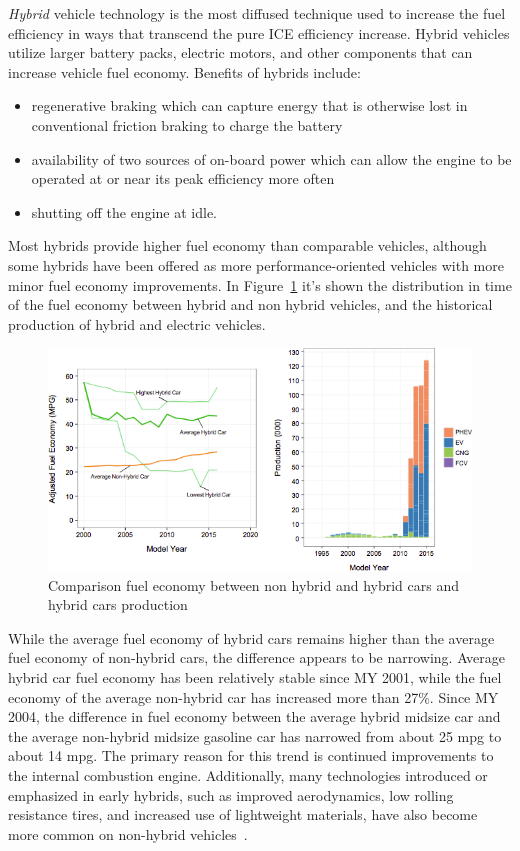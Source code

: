 \emph{Hybrid} vehicle technology is the most diffused technique used to increase the fuel efficiency in ways that transcend the pure ICE efficiency increase. Hybrid vehicles utilize larger battery packs, electric motors, and other components that can  increase vehicle fuel economy. Benefits of hybrids include:
\begin{itemize}
\item regenerative braking which can capture energy that is otherwise lost in conventional friction braking to charge the battery
\item availability of two sources of on-board power which can allow the engine to be operated at or  near its peak efficiency more often
\item shutting off the engine at idle.
\end{itemize} 

Most hybrids provide higher fuel economy than comparable vehicles, although some hybrids have been offered as more performance-oriented vehicles with more minor fuel economy improvements. In Figure~\ref{fig:hybrids} it's shown the distribution in time of the fuel economy between hybrid and non hybrid vehicles, and the historical production of hybrid and electric vehicles.

\begin{figure}[ht]
  \centering
  \includegraphics[width=\textwidth]{figures/review/hybrid.png}
  \caption{Comparison fuel economy between non hybrid and hybrid cars and hybrid cars production \label{fig:hybrids} }
\end{figure}


While the average fuel economy of hybrid cars remains higher than the average fuel economy  of non-hybrid cars, the difference appears to be narrowing. Average hybrid car fuel economy  has been relatively stable since MY 2001, while the fuel economy of the average non-hybrid car has increased more than 27\%. Since MY 2004, the difference in fuel economy between the average hybrid midsize car and the average non-hybrid midsize gasoline car has narrowed from about 25 mpg to about 14 mpg. The primary reason for this trend is continued improvements to the internal combustion engine. Additionally, many technologies introduced or emphasized in early hybrids, such as improved aerodynamics, low rolling resistance tires, and increased use of lightweight materials, have also become more common on non-hybrid vehicles~\cite{EPA2016}.

